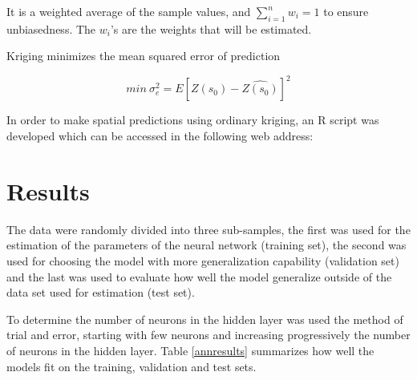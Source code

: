 \documentclass[11pt,twoside]{rmta2010esp}%
\begin{document}
It is a weighted average of the sample values, and $ \sum_{i=1}^{n} w_{i} = 1 $ to ensure unbiasedness. The $w_{i}$'s are the weights that will be estimated. 
  
Kriging minimizes the mean squared error of prediction 

\begin{equation}
min \ \sigma_{e}^{2} = E\left[Z(s_{0}) - \hat{Z(s_{0})}\right]^{2}
\end{equation}  

In order to make spatial predictions using ordinary kriging, an R script was developed which can be accessed in the following web address: 



\section{Results}
The data were randomly divided into three sub-samples, the first was used for the
estimation of the parameters of the neural network (training set), the second was used for
choosing the model with more generalization capability (validation set) and the last was
used to evaluate how well the model generalize outside of the data set used for estimation (test set). 

To determine the number of neurons in the hidden layer was used the method of trial and error, starting with few neurons and increasing progressively the number of neurons in the hidden layer. Table \ref{annresults}
summarizes how well the models fit on the training, validation and test sets.
\end{document}
